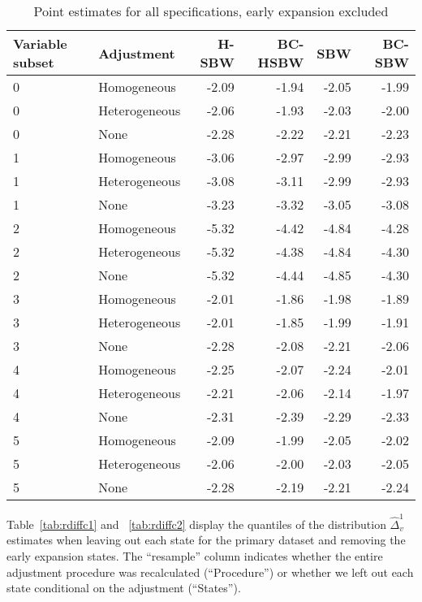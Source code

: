 \begin{table}[ht]
\centering
   \caption{Point estimates for all specifications, early expansion excluded}
    \label{tab:secondaryptests}
\begin{tabular}{llrrrr}
  \hline
Variable subset & Adjustment & H-SBW & BC-HSBW & SBW & BC-SBW \\ 
  \hline
0 & Homogeneous & -2.09 & -1.94 & -2.05 & -1.99 \\ 
  0 & Heterogeneous & -2.06 & -1.93 & -2.03 & -2.00 \\ 
  0 & None & -2.28 & -2.22 & -2.21 & -2.23 \\ 
  1 & Homogeneous & -3.06 & -2.97 & -2.99 & -2.93 \\ 
  1 & Heterogeneous & -3.08 & -3.11 & -2.99 & -2.93 \\ 
  1 & None & -3.23 & -3.32 & -3.05 & -3.08 \\ 
  2 & Homogeneous & -5.32 & -4.42 & -4.84 & -4.28 \\ 
  2 & Heterogeneous & -5.32 & -4.38 & -4.84 & -4.30 \\ 
  2 & None & -5.32 & -4.44 & -4.85 & -4.30 \\ 
  3 & Homogeneous & -2.01 & -1.86 & -1.98 & -1.89 \\ 
  3 & Heterogeneous & -2.01 & -1.85 & -1.99 & -1.91 \\ 
  3 & None & -2.28 & -2.08 & -2.21 & -2.06 \\ 
  4 & Homogeneous & -2.25 & -2.07 & -2.24 & -2.01 \\ 
  4 & Heterogeneous & -2.21 & -2.06 & -2.14 & -1.97 \\ 
  4 & None & -2.31 & -2.39 & -2.29 & -2.33 \\ 
  5 & Homogeneous & -2.09 & -1.99 & -2.05 & -2.02 \\ 
  5 & Heterogeneous & -2.06 & -2.00 & -2.03 & -2.05 \\ 
  5 & None & -2.28 & -2.19 & -2.21 & -2.24 \\ 
   \hline
\end{tabular}
\end{table}

Table~\ref{tab:rdiffc1} and ~\ref{tab:rdiffc2} display the quantiles of the distribution $\hat{\Delta}_v^1$ estimates when leaving out each state for the primary dataset and removing the early expansion states. The ``resample'' column indicates whether the entire adjustment procedure was recalculated (``Procedure'') or whether we left out each state conditional on the adjustment (``States''). 

